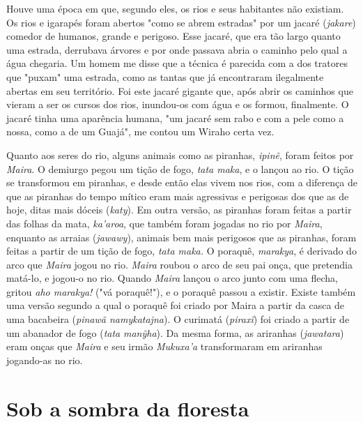 Houve uma época em que, segundo eles, os rios e seus habitantes não
existiam. Os rios e igarapés foram abertos "como se abrem estradas" por
um jacaré (\emph{jakare}) comedor de humanos, grande e perigoso. Esse
jacaré, que era tão largo quanto uma estrada, derrubava árvores e por
onde passava abria o caminho pelo qual a água chegaria. Um homem me
disse que a técnica é parecida com a dos tratores que "puxam" uma
estrada, como as tantas que já encontraram ilegalmente abertas em seu
território. Foi este jacaré gigante que, após abrir os caminhos que
vieram a ser os cursos dos rios, inundou-os com água e os formou,
finalmente. O jacaré tinha uma aparência humana, "um jacaré sem rabo e
com a pele como a nossa, como a de um Guajá", me contou um Wiraho certa
vez.

Quanto aos seres do rio, alguns animais como as piranhas, \emph{ipinẽ},
foram feitos por \emph{Maira}. O demiurgo pegou um tição de fogo,
\emph{tata maka}, e o lançou ao rio. O tição se transformou em piranhas,
e desde então elas vivem nos rios, com a diferença de que as piranhas do
tempo mítico eram mais agressivas e perigosas dos que as de hoje, ditas
mais dóceis (\emph{katy}). Em outra versão, as piranhas foram feitas a
partir das folhas da mata, \emph{ka'aroa}, que também foram jogadas no
rio por \emph{Maira}, enquanto as arraias (\emph{jawawy}), animais bem
mais perigosos que as piranhas, foram feitas a partir de um tição de
fogo, \emph{tata maka.} O poraquê, \emph{marakya}, é derivado do arco
que \emph{Maira} jogou no rio. \emph{Maira} roubou o arco de seu pai
onça, que pretendia matá-lo, e jogou-o no rio. Quando \emph{Maira}
lançou o arco junto com uma flecha, gritou \emph{aho marakya!} ("vá
poraquê!"), e o poraquê passou a existir. Existe também uma versão
segundo a qual o poraquê foi criado por Maira a partir da casca de uma
bacabeira (\emph{pinawã namykatajna}). O curimatá (\emph{piraxĩ}) foi
criado a partir de um abanador de fogo (\emph{tata} \emph{manỹha}). Da
mesma forma, as ariranhas (\emph{jawatara}) eram onças que \emph{Maira}
e seu irmão \emph{Mukuxa'a} transformaram em ariranhas jogando-as no
rio.

\section{Sob a sombra da floresta }\label{sob-a-sombra-da-floresta}

